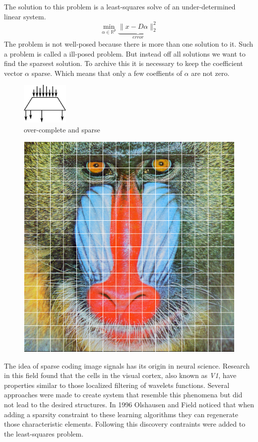 The solution to this problem is a least-squares solve of an under-determined
linear system.
\begin{equation}
\min_{\alpha\in\mathbb{R}^{p}} \underbrace{\lVert x - D\alpha
\rVert^{2}_{2}}_{error} \label{eq:problem}
\end{equation}
The problem is not well-posed because there is more than one
solution to it. Such a problem is called a ill-posed problem.
But instead off all solutions we want to find the sparsest
solution. 
To archive this it is necessary to keep the coefficient vector $\alpha$ sparse.
Which means that only a few coeffients of $\alpha$ are not zero. 
\begin{figure}[h]
\centering
\includegraphics[width = 0.20\textwidth]{images/sparse.pdf}
\caption{over-complete and sparse}
\label{fig:sparse}
\end{figure}

\begin{figure}[h]
\centering
\includegraphics[scale = 0.25]{images/segmentation.png}
\caption{}
\label{fig:sparse}
\end{figure}
The idea of sparse coding image signals has its origin in neural science. 
Research in this field found that the cells in the visual cortex, also known as
\emph{V1}, have properties similar to those localized filtering of wavelets
functions. Several approaches were made to create system that resemble this
phenomena but did not lead to the desired structures. In 1996 Olshausen and
Field\cite{Olshausen1996} noticed that when adding a sparsity constraint to
these learning algorithms they can regenerate those characteristic elements.
Following this discovery contraints were added to the least-squares problem.


